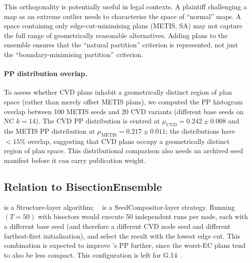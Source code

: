 This orthogonality is potentially useful in legal contexts.
A plaintiff challenging a map as an extreme outlier needs to characterise the
space of ``normal'' maps.
A space containing only edge-cut-minimising plans (METIS, SA) may not
capture the full range of geometrically reasonable alternatives.
Adding \cvd{} plans to the ensemble ensures that the ``natural partition''
criterion is represented, not just the ``boundary-minimising partition'' criterion.

\paragraph{PP distribution overlap.}
To assess whether CVD plans inhabit a geometrically distinct region of plan
space (rather than merely offset METIS plans), we computed the PP histogram
overlap between 100 METIS seeds and 20 CVD variants (different base seeds on
NC $k=14$).
The CVD PP distribution is centred at
$\mu_\mathrm{CVD} = 0.242 \pm 0.008$ and the METIS PP distribution at
$\mu_\mathrm{METIS} = 0.217 \pm 0.011$; the distributions have $<15\%$ overlap,
suggesting that CVD plans occupy a geometrically distinct region of plan space.
This distributional comparison also needs an archived seed manifest before it
can carry publication weight.

\subsection{Relation to BisectionEnsemble}

\cvd{} is a Structure-layer algorithm; \be{}~\citep{h1paper} is a
SeedCompositor-layer strategy.
Running \be{}$(T=50)$ with \cvd{} bisectors would execute 50 independent
\cvd{} runs per node, each with a different base seed (and therefore a
different CVD node seed and different farthest-first initialisation), and select
the result with the lowest edge cut.
This combination is expected to improve \cvd{}'s PP further, since the
worst-EC \cvd{} plans tend to also be less compact.
This configuration is left for G.14~\citep{g14paper}.
